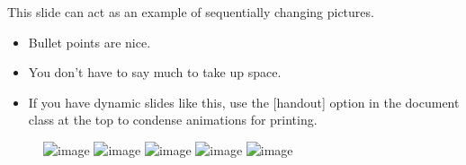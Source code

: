 \documentclass[11pt]{beamer} %
\begin{document}
\begin{frame}
This slide can act as an example of sequentially changing pictures.
\begin{itemize}
\item Bullet points are nice.
\item You don't have to say much to take up space.
\item If you have dynamic slides like this, use the [handout] option in the document class at the top to condense animations for printing.
\end{itemize}
\vspace{-.5cm}
\begin{figure} 
\includegraphics<2>[width=\textwidth]{CavEvent1}
\includegraphics<3>[width=\textwidth]{CavEvent2}
\includegraphics<4>[width=\textwidth]{CavEvent3}
\includegraphics<5>[width=\textwidth]{CavEvent4}
\includegraphics<6>[width=\textwidth]{CavEvent5}
\end{figure} 
\end{frame}
\end{document}

